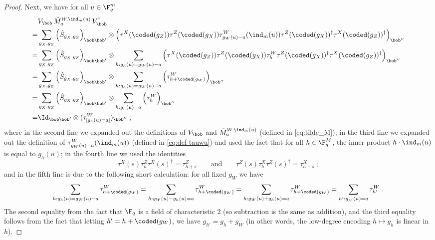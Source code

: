 \begin{proof}
	Next, we have for all $u \in \F_q^m$ 
	\begin{align}
		&V_\bob \, \tilde{M}^{W,\ind_m(u)}_a \, V_\bob^\dagger \notag \\
		= &\sum_{g_X, g_Z} \Big( \hat{S}_{g_X,g_Z}  \Big)_{\bob \bob'} \otimes \Big ( \tau^X(\coded(g_Z)) \tau^Z(\coded(g_X)) \tau^W_{g_W(u) - a}(\ind_m(u))    \tau^Z(\coded(g_X))^\dagger \tau^X(\coded(g_Z))^\dagger \Big)_{\bob ''} \notag \\
		= &\sum_{g_X, g_Z} \Big( \hat{S}_{g_X,g_Z}  \Big)_{\bob \bob'} \otimes \sum_{h : g_h(u) = g_W(u) - a} \Big ( \tau^X(\coded(g_Z)) \tau^Z(\coded(g_X)) \tau^W_h   \tau^Z(\coded(g_X))^\dagger \tau^X(\coded(g_Z))^\dagger \Big)_{\bob ''} \notag \\
		= &\sum_{g_X, g_Z} \Big( \hat{S}_{g_X,g_Z}  \Big)_{\bob \bob'} \otimes \sum_{h : g_h(u) = g_W(u) - a} \Big ( \tau^W_{h + \coded(g_W)}   \Big)_{\bob ''} \notag \\
	= &\sum_{g_X, g_Z} \Big( \hat{S}_{g_X,g_Z}  \Big)_{\bob \bob'} \otimes \sum_{h : g_h(u) = a} \Big ( \tau^W_{h}   \Big)_{\bob ''} \notag \\
= &\Id_{\bob \bob'} \otimes (\tau^W_{[g_h(u)=a]})_{\bob''}\;,		\label{eq:qld-unitary-6}
	\end{align}
	where in the second line we expanded out the definitions of $V_\bob$ and $\tilde{M}^{W,\ind_m(u)}_a$ (defined in \cref{eq:tilde_M}); in the third line we expanded out the definition of $\tau^W_{g_W(u) - a}(\ind_m(u))$ (defined in \cref{eq:def-tauwu}) and used the fact that for all $h \in \F_q^M$, the inner product $h \cdot \ind_m(u)$ is equal to $g_h(u)$; in the fourth line we used the identities
	\[
		\tau^X(s) \tau^Z_h \tau^X(s)^\dagger = \tau^Z_{h + s} \qquad \text{and} \qquad \tau^Z(s) \tau^X_h \tau^Z(s)^\dagger = \tau^X_{h + s}~;
	\]
	and in the fifth line is due to the following short calculation: for all fixed $g_W$ we have
	\begin{align*}
		\sum_{h : g_h(u) = g_W(u) - a}  \tau^W_{h + \coded(g_W)} = \sum_{h: g_W(u) - g_h(u) = a} \tau^W_{h + \coded(g_W)} = \sum_{h: g_W(u) + g_h(u) = a} \tau^W_{h + \coded(g_W)} = \sum_{h': g_{h'}(u) = a} \tau^W_{h'}~.
	\end{align*}
	The second equality from the fact that $\F_q$ is a field of characteristic $2$ (so subtraction is the same as addition), and the third equality follows from the fact that letting $h' = h + \coded(g_W)$, we have $g_{h'} = g_h + g_W$ (in other words, the low-degree encoding $h \mapsto g_h$ is linear in $h$). 
	

\end{proof}
